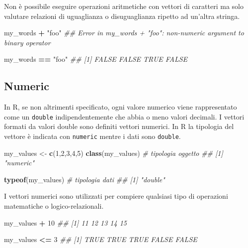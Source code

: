 \documentclass[
]{book}
\newenvironment{Shaded}{\begin{snugshade}}{\end{snugshade}}
\newcommand{\CommentTok}[1]{\textcolor[rgb]{0.56,0.35,0.01}{\textit{#1}}}
\newcommand{\DecValTok}[1]{\textcolor[rgb]{0.00,0.00,0.81}{#1}}
\newcommand{\KeywordTok}[1]{\textcolor[rgb]{0.13,0.29,0.53}{\textbf{#1}}}
\newcommand{\NormalTok}[1]{#1}
\newcommand{\OperatorTok}[1]{\textcolor[rgb]{0.81,0.36,0.00}{\textbf{#1}}}
\newcommand{\StringTok}[1]{\textcolor[rgb]{0.31,0.60,0.02}{#1}}
\begin{document}
Non è possibile eseguire operazioni aritmetiche con vettori di caratteri ma solo valutare relazioni di uguaglianza o disuguaglianza ripetto ad un'altra stringa.

\begin{Shaded}
\begin{Highlighting}[]
\NormalTok{my_words }\OperatorTok{+}\StringTok{ "foo"}
\CommentTok{## Error in my_words + "foo": non-numeric argument to binary operator}

\NormalTok{my_words }\OperatorTok{==}\StringTok{ "foo"}
\CommentTok{## [1] FALSE FALSE  TRUE FALSE}
\end{Highlighting}
\end{Shaded}

\hypertarget{numeric}{%
\subsection{Numeric}\label{numeric}}

In R, se non altrimenti specificato, ogni valore numerico viene rappresentato come un \texttt{double} indipendentemente che abbia o meno valori decimali. I vettori formati da valori double sono definiti vettori numerici. In R la tipologia del vettore è indicata con \texttt{numeric} mentre i dati sono \texttt{double}.

\begin{Shaded}
\begin{Highlighting}[]
\NormalTok{my_values <-}\StringTok{ }\KeywordTok{c}\NormalTok{(}\DecValTok{1}\NormalTok{,}\DecValTok{2}\NormalTok{,}\DecValTok{3}\NormalTok{,}\DecValTok{4}\NormalTok{,}\DecValTok{5}\NormalTok{)}
\KeywordTok{class}\NormalTok{(my_values)  }\CommentTok{# tipologia oggetto}
\CommentTok{## [1] "numeric"}

\KeywordTok{typeof}\NormalTok{(my_values) }\CommentTok{# tipologia dati}
\CommentTok{## [1] "double"}
\end{Highlighting}
\end{Shaded}

I vettori numerici sono utilizzati per compiere qualsiasi tipo di operazioni matematiche o logico-relazionali.

\begin{Shaded}
\begin{Highlighting}[]
\NormalTok{my_values }\OperatorTok{+}\StringTok{ }\DecValTok{10}
\CommentTok{## [1] 11 12 13 14 15}

\NormalTok{my_values }\OperatorTok{<=}\StringTok{ }\DecValTok{3}
\CommentTok{## [1]  TRUE  TRUE  TRUE FALSE FALSE}
\end{Highlighting}
\end{Shaded}
\end{document}

